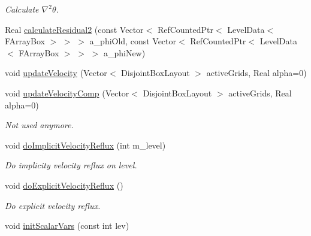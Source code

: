 \begin{DoxyCompactItemize}
\begin{DoxyCompactList}\small\item\em Calculate $ \nabla^2 \theta $. \end{DoxyCompactList}\item 
Real \hyperlink{classamr_mushy_layer_a97818cd2b7076805211c086af2d375f1}{calculate\-Residual2} (const Vector$<$ Ref\-Counted\-Ptr$<$ Level\-Data$<$ F\-Array\-Box $>$ $>$ $>$ a\-\_\-phi\-Old, const Vector$<$ Ref\-Counted\-Ptr$<$ Level\-Data$<$ F\-Array\-Box $>$ $>$ $>$ a\-\_\-phi\-New)
\item 
void \hyperlink{classamr_mushy_layer_a876a962765e746e053aed9f8383868a6}{update\-Velocity} (Vector$<$ Disjoint\-Box\-Layout $>$ active\-Grids, Real alpha=0)
\item 
\hypertarget{classamr_mushy_layer_a2497035467f060ad356e6f1c63c717c9}{void \hyperlink{classamr_mushy_layer_a2497035467f060ad356e6f1c63c717c9}{update\-Velocity\-Comp} (Vector$<$ Disjoint\-Box\-Layout $>$ active\-Grids, Real alpha=0)}\label{classamr_mushy_layer_a2497035467f060ad356e6f1c63c717c9}

\begin{DoxyCompactList}\small\item\em Not used anymore. \end{DoxyCompactList}\item 
\hypertarget{classamr_mushy_layer_a6fef0624f462d75984aca1c995f8c2aa}{void \hyperlink{classamr_mushy_layer_a6fef0624f462d75984aca1c995f8c2aa}{do\-Implicit\-Velocity\-Reflux} (int m\-\_\-level)}\label{classamr_mushy_layer_a6fef0624f462d75984aca1c995f8c2aa}

\begin{DoxyCompactList}\small\item\em Do implicity velocity reflux on level. \end{DoxyCompactList}\item 
\hypertarget{classamr_mushy_layer_a09ace24946676ed537647ccd6950bc5b}{void \hyperlink{classamr_mushy_layer_a09ace24946676ed537647ccd6950bc5b}{do\-Explicit\-Velocity\-Reflux} ()}\label{classamr_mushy_layer_a09ace24946676ed537647ccd6950bc5b}

\begin{DoxyCompactList}\small\item\em Do explicit velocity reflux. \end{DoxyCompactList}\item 
\hypertarget{classamr_mushy_layer_a28fe2843693ea38d7be472049f7eae28}{void \hyperlink{classamr_mushy_layer_a28fe2843693ea38d7be472049f7eae28}{init\-Scalar\-Vars} (const int lev)}\label{classamr_mushy_layer_a28fe2843693ea38d7be472049f7eae28}


\end{DoxyCompactItemize}

